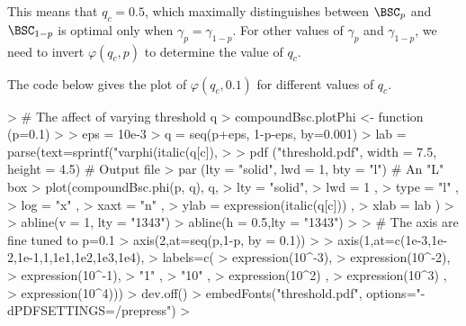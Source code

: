 This means that $q_c=0.5$, which maximally distinguishes
between $\BSC_p$ and $\BSC_{1-p}$ is optimal only when $γ_p =
γ_{1-p}$. For other values of $γ_p$ and $γ_{1-p}$, we need to
invert $φ(q_c,p)$ to determine the value of $q_c$. 

\begin{Schunk}
\end{Schunk}

The code below gives the plot of $φ(q_c,0.1)$ for different values of $q_c$.

\begin{Schunk}
\begin{Sinput}
> # The affect of varying threshold q
> compoundBsc.plotPhi <- function (p=0.1)
> {
>   eps = 10e-3
>   q   = seq(p+eps, 1-p-eps, by=0.001)            
>   lab = parse(text=sprintf("varphi(italic(q[c]), %.1f)", p))
> 
>   pdf ("threshold.pdf", width = 7.5, height = 4.5)  # Output file
>   par (lty = "solid", lwd = 1, bty = "l")           # An "L" box
>   plot(compoundBsc.phi(p, q), q,
>        lty  = "solid",
>        lwd  = 1      ,
>        type = "l"    ,
>        log  = "x"    ,
>        xaxt = "n"    ,
>        ylab = expression(italic(q[c])) ,
>        xlab = lab    )
> 
>   abline(v = 1,  lty = "1343")
>   abline(h = 0.5,lty = "1343")
> 
>   # The axis are fine tuned to p=0.1
>   axis(2,at=seq(p,1-p, by = 0.1))
> 
>   axis(1,at=c(1e-3,1e-2,1e-1,1,1e1,1e2,1e3,1e4), 
>   labels=c(
>              expression(10^-3), 
>              expression(10^-2), 
>              expression(10^-1), 
>              "1"              , 
>              "10"             , 
>              expression(10^2) , 
>              expression(10^3) ,
>              expression(10^4)))
>   dev.off()
>   embedFonts("threshold.pdf", options="-dPDFSETTINGS=/prepress")
> }
\end{Sinput}
\end{Schunk}


